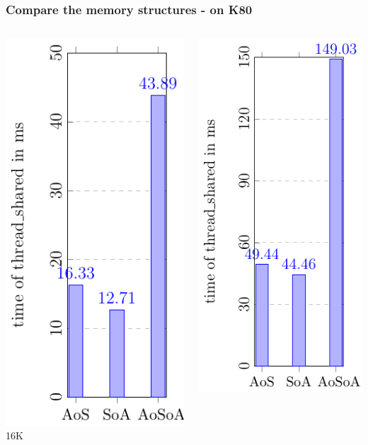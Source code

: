 \documentclass[aspectratio=169]{beamer}
\begin{document}
\begin{frame}
	\frametitle{Compare the memory structures - on K80}
	\begin{columns}
	\begin{column}{0.25\textwidth}
	\includegraphics[scale=0.55]{figures/fig1.pdf}
	\small 16K
	\end{column}
	\begin{column}{0.25\textwidth}
	\includegraphics[scale=0.55]{figures/fig2.pdf}

\end{column}
\end{columns}
\end{frame}
\end{document}
